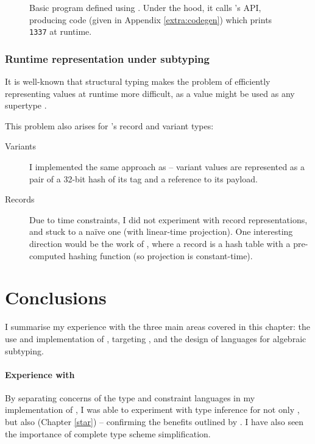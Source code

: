 \begin{figure}[p]
    \centering
    
    \caption{Basic program defined using \binaryendsl{}. Under the hood, it calls \binaryen{}'s API, producing \wasm{} code (given in Appendix \ref{extra:codegen}) which prints \texttt{1337} at runtime.}
    \label{fig:binaryer-example}
\end{figure}

\subsubsection{Runtime representation under subtyping}

It is well-known that structural typing makes the problem of efficiently representing values at runtime more difficult, as a value might be used as any supertype \cite{tapl}. 

This problem also arises for \fabric{}'s record and variant types: 
\begin{description}
    \item[Variants] I implemented the same approach as \textcite{polymorphic-variants} -- variant values are represented as a pair of a 32-bit hash of its tag and a reference to its payload.
    \item[Records] Due to time constraints, I did not experiment with record representations, and stuck to a na\"ive one (with linear-time projection). One interesting direction would be the work of \textcite{remy-extensible-records}, where a record is a hash table with a pre-computed hashing function (so projection is constant-time). 
\end{description}

\needspace{7em}
\section{Conclusions}

I summarise my experience with the three main areas covered in this chapter: the use and implementation of \inference{}, targeting \wasm{}, and the design of languages for algebraic subtyping. 

\paragraph{Experience with \inference{}}
By separating concerns of the type and constraint languages in my implementation of \compiler{}, I was able to experiment with type inference for not only \fabric{}, but also \starr{} (Chapter \ref{star}) -- confirming the benefits outlined by \textcite{pottier-framework}. I have also seen the importance of complete type scheme simplification. 


